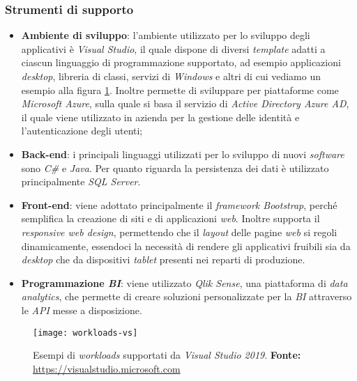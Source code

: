 \subsubsection{Strumenti di supporto}
\begin{itemize}
	\item \textbf{Ambiente di sviluppo}: l'ambiente utilizzato per lo sviluppo degli applicativi è \textit{Visual Studio}, il quale dispone di diversi \textit{template} adatti a ciascun linguaggio di programmazione supportato, ad esempio applicazioni \textit{desktop}, libreria di classi, servizi di \textit{Windows} e altri di cui vediamo un esempio alla figura \ref{fig:workload-vs}. Inoltre permette di sviluppare per piattaforme come \textit{Microsoft Azure}, sulla quale si basa il servizio di \textit{Active Directory Azure AD}, il quale viene utilizzato in azienda per la gestione delle identità e l'autenticazione degli utenti;
	\item \textbf{Back-end}: i principali linguaggi utilizzati per lo sviluppo di nuovi \textit{software} sono \textit{C\#} e \textit{Java}. 
	Per quanto riguarda la persistenza dei dati è utilizzato principalmente \textit{SQL Server}.
	\item \textbf{Front-end}: viene adottato principalmente il \textit{framework Bootstrap}, perché semplifica la creazione di siti e di applicazioni \textit{web}. Inoltre supporta il \textit{responsive web design}, permettendo che il \textit{layout} delle pagine \textit{web} si regoli dinamicamente, essendoci la necessità di rendere gli applicativi fruibili sia da \textit{desktop} che da dispositivi \textit{tablet} presenti nei reparti di produzione.
	\item \textbf{Programmazione \textit{BI}}: viene utilizzato \textit{Qlik Sense}, una piattaforma di \textit{data analytics}, che permette di creare soluzioni personalizzate per la \textit{BI} attraverso le \textit{API} messe a disposizione.
\end{itemize}



\begin{figure}[htbp]
	\begin{center}
		\texttt{[image: workloads-vs]}
		\caption{Esempi di \textit{workloads} supportati da \textit{Visual Studio 2019}. \newline
		\textbf{Fonte: } \url{https://visualstudio.microsoft.com}}
	\label{fig:workload-vs}
	\end{center}
\end{figure}


